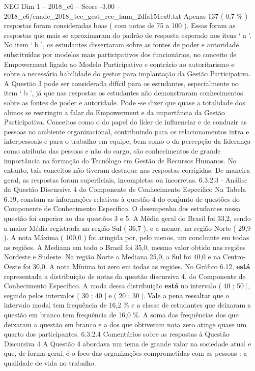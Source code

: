 \begin{textsample}{NEG Dim 1 – 2018\_c6 – Score -3.00 – 2018\_c6/enade\_2018\_tec\_gest\_rec\_hum\_2dfa151ea0.txt}
Apenas 137 ( 0,7 \% ) respostas foram consideradas boas ( com notas de 75 a 100 ).
Essas foram as respostas que mais se aproximaram do padrão de resposta esperado nos itens ‘ a ’.
No item ‘ b ’, os estudantes dissertaram sobre as fontes de poder e autoridade substituídas por modelos mais participativos dos funcionários, no conceito de Empowerment ligado ao Modelo Participativo e contrário ao autoritarismo e sobre a necessária habilidade do gestor para implantação da Gestão Participativa.
A Questão 3 pode ser considerada difícil para os estudantes, especialmente no item ‘ b ’, já que nas respostas os estudantes não demonstraram conhecimentos sobre as fontes de poder e autoridade.
Pode -se dizer que quase a totalidade dos alunos se restringiu a falar do Empowerment e da importância da Gestão Participativa.
Conceitos como o do papel do líder de influenciar e de conduzir as pessoas no ambiente organizacional, contribuindo para os relacionamentos intra e interpessoais e para o trabalho em equipe, bem como o da percepção da liderança como atributo das pessoas e não do cargo, são conhecimentos de grande importância na formação do Tecnólogo em Gestão de Recursos Humanos.
No entanto, tais conceitos não tiveram destaque nas respostas corrigidas.
De maneira geral, as respostas foram superficiais, incompletas ou incorretas. 6.3.2.3 - Análise da Questão Discursiva 4 do Componente de Conhecimento Específico Na Tabela 6.19, constam as informações relativas à questão 4 do conjunto de questões do Componente de Conhecimento Específico.
O desempenho dos estudantes nessa questão foi superior ao das questões 3 e 5.
A Média geral do Brasil foi 33,2, sendo a maior Média registrada na região Sul ( 36,7 ), e a menor, na região Norte ( 29,9 ).
A nota Máxima ( 100,0 ) foi atingida por, pelo menos, um concluinte em todas as regiões.
A Mediana em todo o Brasil foi 35,0, mesmo valor obtido nas regiões Nordeste e Sudeste.
Na região Norte a Mediana 25,0, a Sul foi 40,0 e na Centro-Oeste foi 30,0.
A nota Mínima foi zero em todas as regiões.
No Gráfico 6.12, \textbf{está} representada a distribuição de notas da questão discursiva 4, do Componente de Conhecimento Específico.
A moda dessa distribuição \textbf{está} no intervalo ( 40 ; 50 ], seguido pelos intervalos ( 30 ; 40 ] e ( 20 ; 30 ].
Vale a pena ressaltar que o intervalo modal tem frequência de 16,2 \% e a classe de estudantes que deixaram a questão em branco tem frequência de 16,0 \%.
A soma das frequências dos que deixaram a questão em branco e a dos que obtiveram nota zero atinge quase um quarto dos participantes. 6.3.2.4 Comentários sobre as respostas à Questão Discursiva 4 A Questão 4 abordava um tema de grande valor na sociedade atual e que, de forma geral, é o foco das organizações comprometidas com as pessoas : a qualidade de vida no trabalho.

\end{textsample}
